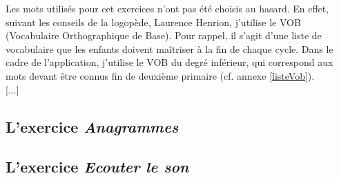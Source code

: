 Les mots utilisés pour cet exercices n'ont pas été choisis au hasard. En effet, suivant les conseils de la logopède, Laurence Henrion, j'utilise le VOB (Vocabulaire Orthographique de Base). Pour rappel, il s'agit d'une liste de vocabulaire que les enfants doivent maîtriser à la fin de chaque cycle. Dans le cadre de l'application, j'utilise le VOB du degré inférieur, qui correspond aux mots devant être connus fin de deuxième primaire (cf. annexe \ref{listeVob}).\\

[...]
	
\subsection{L'exercice \textit{Anagrammes}}


\subsection{L'exercice \textit{Ecouter le son}}


